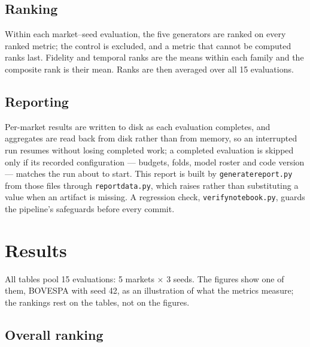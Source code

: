 \documentclass[11pt,a4paper]{article}
\makeatletter
\DeclareRobustCommand{\_}{\ifmmode\nfss@text{\textunderscore}\else\textunderscore\allowbreak\fi}
\makeatother
\begin{document}
\subsection{Ranking}
Within each market--seed evaluation, the five generators are ranked on every ranked metric; the control is excluded, and a metric that cannot be computed ranks last. Fidelity and temporal ranks are the means within each family and the composite rank is their mean. Ranks are then averaged over all 15 evaluations.

\subsection{Reporting}
Per-market results are written to disk as each evaluation completes, and aggregates are read back from disk rather than from memory, so an interrupted run resumes without losing completed work; a completed evaluation is skipped only if its recorded configuration --- budgets, folds, model roster and code version --- matches the run about to start. This report is built by \texttt{generate\_report.py} from those files through \texttt{report\_data.py}, which raises rather than substituting a value when an artifact is missing. A regression check, \texttt{verify\_notebook.py}, guards the pipeline's safeguards before every commit.
\section{Results}
\label{sec:results}
All tables pool 15 evaluations: 5 markets $\times$ 3 seeds. The figures show one of them, BOVESPA with seed 42, as an illustration of what the metrics measure; the rankings rest on the tables, not on the figures.

\subsection{Overall ranking}
\label{sec:ranking}
\end{document}
